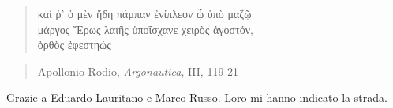 \begin{verse}
	\begin{otherlanguage}{greek}
		καί ῥ' ὁ μὲν ἤδη πάμπαν ἐνίπλεον ᾧ ὑπὸ μαζῷ\\
		μάργος Ἔρως λαιῆς ὑποΐσχανε χειρὸς ἀγοστόν,\\
		ὀρθὸς ἐφεστηώς
	\end{otherlanguage}
\end{verse}

\begin{verse}
Apollonio Rodio, \emph{Argonautica}, III, 119-21
\end{verse}

\newpage

\vspace*{12cm}

Grazie a Eduardo Lauritano e Marco Russo. Loro mi hanno indicato la strada.
